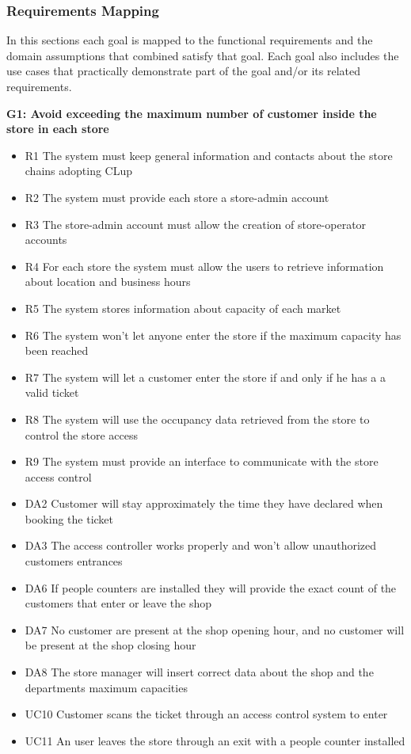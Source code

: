 \subsubsection{Requirements Mapping}
In this sections each goal is mapped to the functional requirements and the domain assumptions that combined satisfy that goal. Each goal also includes the use cases that practically demonstrate part of the goal and/or its related requirements.

\bigskip

\textbf{G1: Avoid exceeding the maximum number of customer inside the store in each store}
\begin{itemize}[label=\textcolor{clup_blue2}{\textbullet}]
    \item R1 The system must keep general information and contacts about the store chains adopting CLup
    \item R2 The system must provide each store a store-admin account
    \item R3 The store-admin account must allow the creation of store-operator accounts
    \item R4 For each store the system must allow the users to retrieve information about location and business hours
    \item R5 The system stores information about capacity of each market
    \item R6 The system won’t let anyone enter the store if the maximum capacity has been reached
    \item R7 The system will let a customer enter the store if and only if he has a a valid ticket
    \item R8 The system will use the occupancy data retrieved from the store to control the store access
    \item R9 The system must provide an interface to communicate with the store access control
\end{itemize}
\begin{itemize}[label=\textcolor{clup_red}{\textbullet}]
    \item DA2 Customer will stay approximately the time they have declared when booking the ticket
    \item DA3 The access controller works properly and won't allow unauthorized customers entrances
    \item DA6 If people counters are installed they will provide the exact count of the customers that enter or leave the shop
    \item DA7 No customer are present at the shop opening hour, and no customer will be present at the shop closing hour
    \item DA8 The store manager will insert correct data about the shop and the departments maximum capacities
\end{itemize}
\begin{itemize}[label=\textcolor{clup_yellow}{\textbullet}]
    \item UC10 Customer scans the ticket through an access control system to enter
    \item UC11 An user leaves the store through an exit with a people counter installed
\end{itemize}

